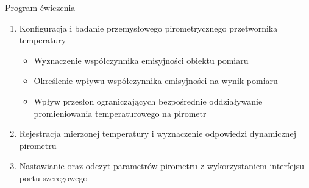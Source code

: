 \documentclass[12pt]{article}
\begin{document}
 
 


\begin{section}{Program ćwiczenia}
	\begin{enumerate}
	  	\item Konfiguracja i badanie przemysłowego pirometrycznego
					   przetwornika temperatury
		\begin{itemize}
			\item Wyznaczenie współczynnika emisyjności obiektu pomiaru
			\item Określenie wpływu współczynnika emisyjności na wynik pomiaru
			\item Wpływ przesłon ograniczających bezpośrednie oddziaływanie
			promieniowania temperaturowego na pirometr
		\end{itemize}
		\item Rejestracja mierzonej temperatury i wyznaczenie odpowiedzi
			  dynamicznej pirometru
		\item Nastawianie oraz odczyt parametrów pirometru z
			  wykorzystaniem interfejsu portu szeregowego
	\end{enumerate}
\end{section}
\end{document}

